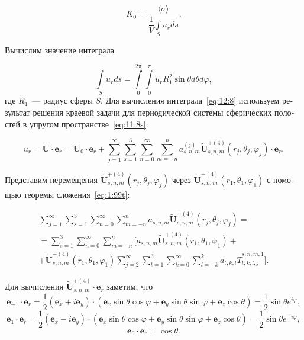 \begin{russian}
\begin{equation}
K_0=\frac{\langle\sigma\rangle}{\dfrac{1}{V}\int\limits_S u_r ds}.
\label{eq:12:7}
\end{equation}

Вычислим значение интеграла

\begin{equation}
\int\limits_S u_r ds=\int\limits_0^{2\pi}\int\limits_0^\pi u_r R_1^2\sin\theta d\theta d\varphi,
\label{eq:12:8}
\end{equation}
где $R_1$~--- радиус сферы $S$. Для вычисления интеграла~\eqref{eq:12:8} используем результат решения краевой задачи для периодической системы сферических полостей в упругом пространстве~\eqref{eq:11:8s}:

\begin{equation}
u_r=\mathbf{U}\cdot\mathbf{e}_r=\mathbf{U}_0\cdot\mathbf{e}_r+\sum\limits_{j=1}^\infty
\sum\limits_{s=1}^3\sum\limits_{n=0}^\infty\sum\limits_{m=-n}^n a_{s,n,m}^{(j)}\mathbf{\tilde U}_{s,n,m}^{+(4)}(r_j,\theta_j,\varphi_j)\cdot\mathbf{e}_r.
\label{eq:12:9}
\end{equation}

Представим перемещения $\mathbf{\tilde U}_{s,n,m}^{+(4)}(r_j,\theta_j,\varphi_j)$ через $\mathbf{\tilde U}_{s,n,m}^{-(4)}(r_1,\theta_1,\varphi_1)$ с помощью теоремы сложения~\eqref{eq:1:99t}:

\begin{multline}
\sum\limits_{j=1}^\infty
\sum\limits_{s=1}^3\sum\limits_{n=0}^\infty\sum\limits_{m=-n}^n a_{s,n,m}\mathbf{\tilde U}_{s,n,m}^{+(4)}(r_j,\theta_j,\varphi_j)= \\
=\sum\limits_{s=1}^3\sum\limits_{n=0}^\infty\sum\limits_{m=-n}^n\bigg\lbrack a_{s,n,m}\mathbf{\tilde U}_{s,n,m}^{+(4)}(r_1,\theta_1,\varphi_1)+ \\
+\mathbf{\tilde U}_{s,n,m}^{-(4)}(r_1,\theta_1,\varphi_1)\sum\limits_{j=2}^\infty\sum\limits_{t=1}^3\sum\limits_{k=0}^\infty\sum\limits_{l=-k}^k a_{t,k,l}\tilde T_{t,k,l,j}^{s,n,m,1}\bigg\rbrack.
\label{eq:12:10}
\end{multline}

Для вычисления $\mathbf{\tilde U}_{s,n,m}^{\pm(4)}\cdot\mathbf{e}_r$ заметим, что
$$
\mathbf{e}_{-1}\cdot\mathbf{e}_r=\frac{1}{2}(\mathbf{e}_x+i\mathbf{e}_y)\cdot(\mathbf{e}_x\sin\theta\cos\varphi+
\mathbf{e}_y\sin\theta\sin\varphi+\mathbf{e}_z\cos\theta)=\frac{1}{2}\sin\theta e^{i\varphi},
$$
$$
\mathbf{e}_1\cdot\mathbf{e}_r=\frac{1}{2}(\mathbf{e}_x-i\mathbf{e}_y)\cdot(\mathbf{e}_x\sin\theta\cos\varphi+
\mathbf{e}_y\sin\theta\sin\varphi+\mathbf{e}_z\cos\theta)=\frac{1}{2}\sin\theta e^{-i\varphi},
$$
$$
\mathbf{e}_0\cdot\mathbf{e}_r=\cos\theta.
$$


\end{russian}
